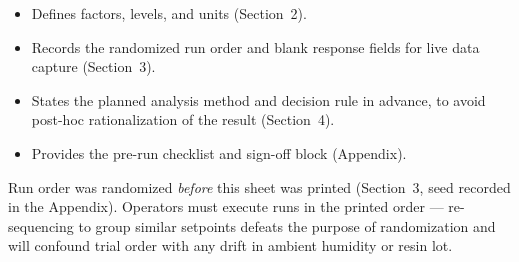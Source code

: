\begin{factorbox}
\begin{itemize}[itemsep=2pt]
  \item Defines factors, levels, and units (Section~2).
  \item Records the randomized run order and blank response fields for live data capture (Section~3).
  \item States the planned analysis method and decision rule in advance, to avoid post-hoc
        rationalization of the result (Section~4).
  \item Provides the pre-run checklist and sign-off block (Appendix).
\end{itemize}
\end{factorbox}

\begin{notebox}
Run order was randomized \emph{before} this sheet was printed (Section~3, seed recorded in the
Appendix). Operators must execute runs in the printed order --- re-sequencing to group similar
setpoints defeats the purpose of randomization and will confound trial order with any drift in
ambient humidity or resin lot.
\end{notebox}
